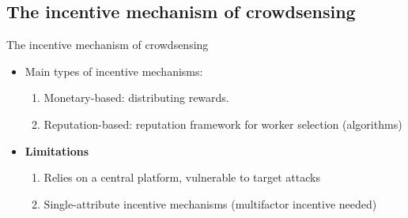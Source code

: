 \subsection{The incentive mechanism of crowdsensing}
\begin{frame}{The incentive mechanism of crowdsensing}
  \begin{itemize}
    \item Main types of incentive mechanisms:
          \begin{enumerate}
            \item \alert{Monetary-based}: distributing rewards. %
            \item \alert{Reputation-based}: reputation framework for worker selection (algorithms)
          \end{enumerate}
    \item \textbf{Limitations}
    	\begin{enumerate}
            \item Relies on a central platform, vulnerable to target attacks
            \item Single-attribute incentive mechanisms (multifactor incentive needed)
          \end{enumerate}
  \end{itemize}
\end{frame}

